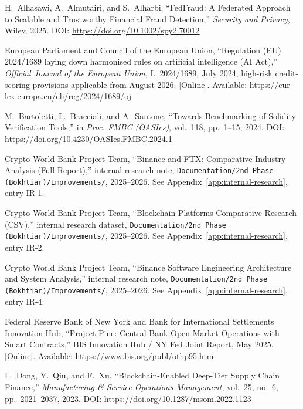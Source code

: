 \documentclass[12pt,a4paper]{report}
\begin{document}
{\begin{enumerate}[label={[\arabic*]}]
\item H.~Alhasawi, A.~Almutairi, and S.~Alharbi, ``FedFraud: A Federated Approach to Scalable and Trustworthy Financial Fraud Detection,'' \textit{Security and Privacy}, Wiley, 2025. DOI: \url{https://doi.org/10.1002/spy2.70012}

\item European Parliament and Council of the European Union, ``Regulation (EU) 2024/1689 laying down harmonised rules on artificial intelligence (AI Act),'' \textit{Official Journal of the European Union}, L~2024/1689, July 2024; high-risk credit-scoring provisions applicable from August 2026. [Online]. Available: \url{https://eur-lex.europa.eu/eli/reg/2024/1689/oj}

\item M.~Bartoletti, L.~Bracciali, and A.~Santone, ``Towards Benchmarking of Solidity Verification Tools,'' in \textit{Proc. FMBC (OASIcs)}, vol.~118, pp.~1--15, 2024. DOI: \url{https://doi.org/10.4230/OASIcs.FMBC.2024.1}

\item Crypto World Bank Project Team, ``Binance and FTX: Comparative Industry Analysis (Full Report),'' internal research note, \texttt{Documentation/2nd Phase (Bokhtiar)/Improvements/}, 2025--2026. See Appendix~\ref{app:internal-research}, entry IR-1.

\item Crypto World Bank Project Team, ``Blockchain Platforms Comparative Research (CSV),'' internal research dataset, \texttt{Documentation/2nd Phase (Bokhtiar)/Improvements/}, 2025--2026. See Appendix~\ref{app:internal-research}, entry IR-2.

\item Crypto World Bank Project Team, ``Binance Software Engineering Architecture and System Analysis,'' internal research note, \texttt{Documentation/2nd Phase (Bokhtiar)/Improvements/}, 2025--2026. See Appendix~\ref{app:internal-research}, entry IR-4.

\item Federal Reserve Bank of New York and Bank for International Settlements Innovation Hub, ``Project Pine: Central Bank Open Market Operations with Smart Contracts,'' BIS Innovation Hub / NY Fed Joint Report, May 2025. [Online]. Available: \url{https://www.bis.org/publ/othp95.htm}

\item L.~Dong, Y.~Qiu, and F.~Xu, ``Blockchain-Enabled Deep-Tier Supply Chain Finance,'' \textit{Manufacturing \& Service Operations Management}, vol.~25, no.~6, pp.~2021--2037, 2023. DOI: \url{https://doi.org/10.1287/msom.2022.1123}


\end{enumerate}}
\end{document}
